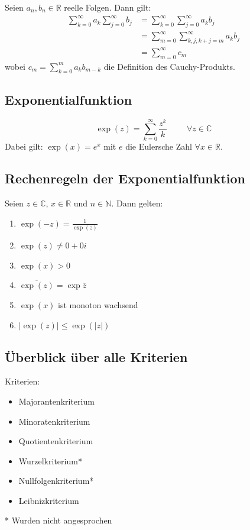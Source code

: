 \documentclass[halfparscip]{scrartcl}
\newcounter{subsection2}
\begin{document}
Seien $a_n, b_n \in \mathbb{R}$ reelle Folgen. Dann gilt:
\begin{align*}
\sum_{k=0}^{\infty}a_k \sum_{j=0}^{\infty}b_j &= \sum_{k=0}^{\infty}\sum_{j=0}^\infty a_kb_j \\
&= \sum_{m=0}^{\infty}\sum_{k,j,k+j = m}^{\infty} a_kb_j \\
&= \sum_{m=0}^{\infty} c_m
\end{align*}
wobei $c_m = \sum\limits_{k=0}^ma_kb_{m-k}$ die Definition des Cauchy-Produkts.

\subsection{Exponentialfunktion}
\begin{equation*}
	\exp(z) = \sum_{k=0}^\infty\frac{z^k}{k\!} \hspace{1cm}\forall z \in \mathbb{C}
\end{equation*}
Dabei gilt: $\exp(x) = e^x$ mit $e$ die Eulersche Zahl $\forall x \in \mathbb{R}$.

\subsection{Rechenregeln der Exponentialfunktion}
Seien $z \in \mathbb{C}$, $x \in \mathbb{R}$ und $n \in \mathbb{N}$. Dann gelten:
\begin{enumerate}
	\item $\exp(-z) = \frac{1}{\exp(z)}$
	\item $\exp(z) \neq 0+0i$
	\item $\exp(x) > 0$
	\item $\overline{\exp(z)} = \exp \overline{z}$
	\item $\exp(x)$ ist monoton wachsend
	\item $\vert \exp(z)\vert \leq \exp (\vert z\vert)$
\end{enumerate}


\subsection*{Überblick über alle Kriterien}
Kriterien:
\begin{itemize}
	\item Majorantenkriterium
	\item Minoratenkriterium
	\item Quotientenkriterium
	\item Wurzelkriterium*
	\item Nullfolgenkriterium*
	\item Leibnizkriterium
\end{itemize}
* Wurden nicht angesprochen
\end{document}
